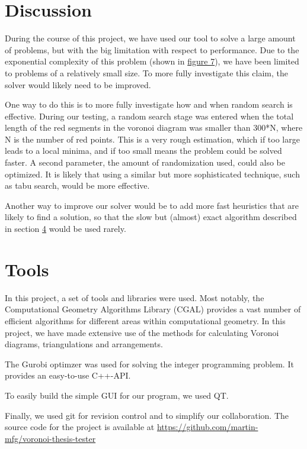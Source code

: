 \documentclass[a4paper,12pt]{article}
\begin{document}
\section{Discussion}
During the course of this project, we have used our tool to solve a large amount of problems, but with the big limitation with respect to performance. Due to the exponential complexity of this problem (shown in \hyperref[ref:speed] {figure 7}), we have been limited to problems of a relatively small size. To more fully investigate this claim, the solver would likely need to be improved.

One way to do this is to more fully investigate how and when random search is effective. During our testing, a random search stage was entered when the total length of the red segments in the voronoi diagram was smaller than 300*N, where N is the number of red points. This is a very rough estimation, which if too large leads to a local minima, and if too small means the problem could be solved faster. A second parameter, the amount of randomization used, could also be optimized. It is likely that using a similar but more sophisticated technique, such as tabu search, would be more effective.

Another way to improve our solver would be to add more fast heuristics that are likely to find a solution, so that the slow but (almost) exact algorithm described in section \hyperref[sec:findPoints]{4} would be used rarely.

\section{Tools}
In this project, a set of tools and libraries were used. Most notably, the Computational Geometry Algorithms Library (CGAL) provides a vast number of efficient algorithms for different areas within computational geometry. In this project, we have made extensive use of the methods for calculating Voronoi diagrams, triangulations and arrangements.

The Gurobi optimzer was used for solving the integer programming problem. It provides an easy-to-use C++-API.

To easily build the simple GUI for our program, we used QT.

Finally, we used git for revision control and to simplify our collaboration. The source code for the project is available at \url{https://github.com/martin-mfg/voronoi-thesis-tester}
\end{document}
